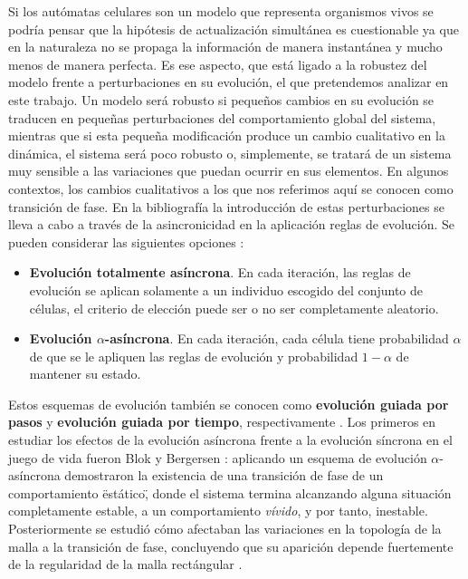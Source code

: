 \documentclass[../proyecto.tex]{book}
\begin{document}
Si los autómatas celulares son un modelo que representa organismos vivos se podría pensar que la hipótesis de actualización simultánea es cuestionable ya que en la naturaleza no se propaga la información de manera instantánea y mucho menos de manera perfecta. Es ese aspecto, que está ligado a la robustez del modelo frente a perturbaciones en su evolución, el que pretendemos analizar en este trabajo. Un modelo será robusto si pequeños cambios en su evolución se traducen en pequeñas perturbaciones del comportamiento global del sistema, mientras que si esta pequeña modificación produce un cambio cualitativo en la dinámica, el sistema será poco robusto o, simplemente, se tratará de un sistema muy sensible a las variaciones que puedan ocurrir en sus elementos. En algunos contextos, los cambios cualitativos a los que nos referimos aquí se conocen como transición de fase. En la bibliografía la introducción de estas perturbaciones se lleva a cabo a través de la asincronicidad en la aplicación reglas de evolución. Se pueden considerar las siguientes opciones \cite{asyncIntro}:
\begin{itemize}
	\item \textbf{Evolución totalmente asíncrona}. En cada iteración, las reglas de evolución se aplican solamente a un individuo escogido del conjunto de células, el criterio de elección puede ser o no ser completamente aleatorio.
	\item \textbf{Evolución $\alpha$-asíncrona}. En cada iteración, cada célula tiene probabilidad $\alpha$ de que se le apliquen las reglas de evolución y probabilidad $1-\alpha$ de mantener su estado.
\end{itemize}

Estos esquemas de evolución también se conocen como \textbf{evolución guiada por pasos} y \textbf{evolución guiada por tiempo}, respectivamente \cite{aka}. Los primeros en estudiar los efectos de la evolución asíncrona frente a la evolución síncrona en el juego de vida fueron Blok y Bergersen \cite{syncVSasync}: aplicando un esquema de evolución $\alpha$-asíncrona demostraron la existencia de una transición de fase de un comportamiento \"estático\", donde el sistema termina alcanzando alguna situación completamente estable, a un comportamiento \textit{vívido}, y por tanto, inestable. Posteriormente se estudió cómo afectaban las variaciones en la topología de la malla a la transición de fase, concluyendo que su aparición depende fuertemente de la regularidad de la malla rectángular \cite{mallaIrregular1, mallaIrregular2}.
\end{document}
